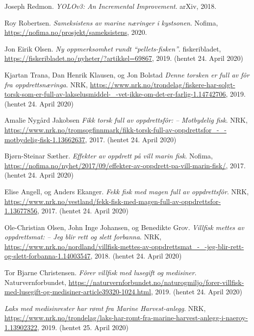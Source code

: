 \documentclass[11ot]{article}
\begin{document}
\begin{thebibliography}{9}
Joseph Redmon. 
\textit{YOLOv3: An Incremental Improvement}. 
arXiv, 2018.

Roy Robertsen. 
\textit{Sameksistens av marine næringer i kystsonen}. 
Nofima, \url{https://nofima.no/prosjekt/sameksistens}, 2020.

Jon Eirik Olsen. 
\textit{Ny oppmerksomhet rundt “pellets-fisken”}. 
fiskeribladet, \url{https://fiskeribladet.no/nyheter/?artikkel=69867}, 2019. (hentet 24. April 2020)

Kjartan Trana, Dan Henrik Klausen, og Jon Bolstad 
\textit{Denne torsken er full av fôr fra oppdrettsnæringa}. 
NRK, \url{https://www.nrk.no/trondelag/fiskere-har-solgt-torsk-som-er-full-av-lakselusmiddel-_-vet-ikke-om-det-er-farlig-1.14742706}, 2019. (hentet 24. April 2020)

 Amalie Nygård Jakobsen
\textit{Fikk torsk full av oppdrettsfôr: – Motbydelig fisk}. 
NRK, \url{https://www.nrk.no/tromsogfinnmark/fikk-torsk-full-av-oppdrettsfor_-_-motbydelig-fisk-1.13662637}, 2017. (hentet 24. April 2020)

Bjørn-Steinar Sæther. 
\textit{Effekter av oppdrett på vill marin fisk}. 
Nofima, \url{https://nofima.no/nyhet/2017/09/effekter-av-oppdrett-pa-vill-marin-fisk/}, 2017. (hentet 24. April 2020)

Elise Angell, og Anders Ekanger. 
\textit{Fekk fisk med magen full av oppdrettsfôr}. 
NRK, \url{https://www.nrk.no/vestland/fekk-fisk-med-magen-full-av-oppdrettsfor-1.13677856}, 2017. (hentet 24. April 2020)

Ole-Christian Olsen, John Inge Johansen, og Benedikte Grov. 
\textit{Villfisk mettes av oppdrettsmat: – Jeg blir rett og slett forbanna}. 
NRK, \url{https://www.nrk.no/nordland/villfisk-mettes-av-oppdrettsmat_-_-jeg-blir-rett-og-slett-forbanna-1.14003547}, 2018. (hentet 24. April 2020)

Tor Bjarne Christensen. 
\textit{Fôrer villfisk med lusegift og medisiner}. 
Naturvernforbundet, \url{https://naturvernforbundet.no/naturogmiljo/forer-villfisk-med-lusegift-og-medisiner-article39320-1024.html}, 2019. (hentet 24. April 2020)

\textit{Laks med medisinrester har rømt fra Marine Harvest-anlegg}. 
NRK, \url{https://www.nrk.no/trondelag/laks-har-romt-fra-marine-harvest-anlegg-i-naeroy-1.13902322}, 2019. (hentet 25. April 2020)


\end{thebibliography}
\end{document}
